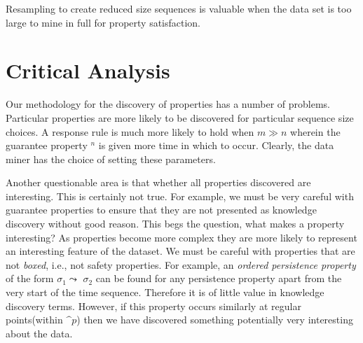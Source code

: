 Resampling to create reduced size sequences is valuable when the data
set is too large to mine in full for property satisfaction.

\section{Critical Analysis}\label{sec:tr_crit_an}

Our methodology for the discovery of properties has a number of
problems. Particular properties are more likely to be discovered for
particular sequence size choices. A response rule  is much
more likely to hold when $m \gg n$ wherein the guarantee property
\diam$^n$ is given more time in which to occur. Clearly, the data
miner has the choice of setting these parameters.

\medskip

Another questionable area is that whether all properties discovered
are interesting. This is certainly not true. For example, we must be
very careful with guarantee properties to ensure that they are not
presented as knowledge discovery without good reason. This begs the
question, what makes a property interesting? As properties become more
complex they are more likely to represent an interesting feature of
the dataset. We must be careful with properties that are not {\em
boxed}, i.e., not safety properties. For example, an {\em ordered
persistence property} of the form $\sigma_1 \leadsto$  $\sigma_2$
can be found for any persistence property apart from the very start of
the time sequence. Therefore it is of little value in knowledge
discovery terms. However, if this property occurs similarly at regular
points(within $\bm^{p}$) then we have discovered something potentially
very interesting about the data.

\medskip

